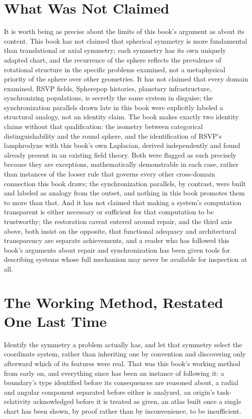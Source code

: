 \documentclass[11pt,fleqn]{book}
\numberwithin{equation}{chapter}
\theoremstyle{plain}
\theoremstyle{definition}
\theoremstyle{remark}
\begin{document}
\section{What Was Not Claimed}

It is worth being as precise about the limits of this book's argument as about its content. This book has not claimed that spherical symmetry is more fundamental than translational or axial symmetry; each symmetry has its own uniquely adapted chart, and the recurrence of the sphere reflects the prevalence of rotational structure in the specific problems examined, not a metaphysical priority of the sphere over other geometries. It has not claimed that every domain examined, RSVP fields, Spherepop histories, planetary infrastructure, synchronizing populations, is secretly the same system in disguise; the synchronization parallels drawn late in this book were explicitly labeled a structural analogy, not an identity claim. The book makes exactly two identity claims without that qualification: the isometry between categorical distinguishability and the round sphere, and the identification of RSVP's lamphrodyne with this book's own Laplacian, derived independently and found already present in an existing field theory. Both were flagged as such precisely because they are exceptions, mathematically demonstrable in each case, rather than instances of the looser rule that governs every other cross-domain connection this book draws; the synchronization parallels, by contrast, were built and labeled as analogy from the outset, and nothing in this book promotes them to more than that. And it has not claimed that making a system's computation transparent is either necessary or sufficient for that computation to be trustworthy; the restoration caveat entered around repair, and the third axis above, both insist on the opposite, that functional adequacy and architectural transparency are separate achievements, and a reader who has followed this book's arguments about repair and synchronization has been given tools for describing systems whose full mechanism may never be available for inspection at all.

\section{The Working Method, Restated One Last Time}

Identify the symmetry a problem actually has, and let that symmetry select the coordinate system, rather than inheriting one by convention and discovering only afterward which of its features were real. That was this book's working method from early on, and everything since has been an instance of following it: a boundary's type identified before its consequences are reasoned about, a radial and angular component separated before either is analyzed, an origin's task-relativity acknowledged before it is treated as given, an atlas built once a single chart has been shown, by proof rather than by inconvenience, to be insufficient.
\end{document}
